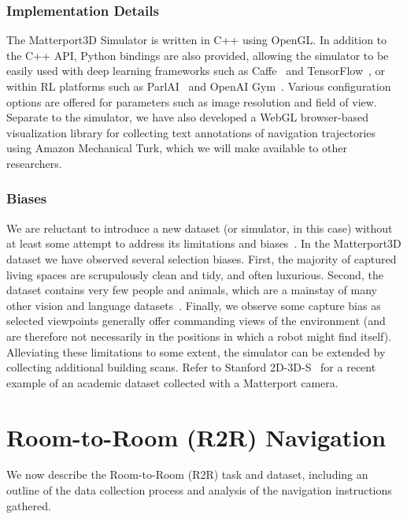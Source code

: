 \documentclass[10pt,twocolumn,letterpaper]{article}
\begin{document}
\subsubsection{Implementation Details}

The Matterport3D Simulator is written in C++ using OpenGL. In addition to the C++ API, Python bindings are also provided, allowing the simulator to be easily used with deep learning frameworks such as Caffe~\cite{jia2014caffe} and TensorFlow~\cite{abadi2016tensorflow}, or within RL platforms such as ParlAI~\cite{parlai} and OpenAI Gym~\cite{openaigym}. Various configuration options are offered for parameters such as image resolution and field of view. Separate to the simulator, we have also developed a WebGL browser-based visualization library for collecting text annotations of navigation trajectories using Amazon Mechanical Turk, which we will make available to other researchers.

\subsubsection{Biases}

We are reluctant to introduce a new dataset (or simulator, in this case) without at least some attempt to address its limitations and biases~\cite{torralba2011unbiased}. In the Matterport3D dataset we have observed several selection biases. First, the majority of captured living spaces are scrupulously clean and tidy, and often luxurious. Second, the dataset contains very few people and animals, which are a mainstay of many other vision and language datasets~\cite{Chen2015,VQA}. Finally, we observe some capture bias as selected viewpoints generally offer commanding views of the environment (and are therefore not necessarily in the positions in which a robot might find itself). Alleviating these limitations to some extent, the simulator can be extended by collecting additional building scans. Refer to Stanford 2D-3D-S~\cite{2017arXiv170201105A} for a recent example of an academic dataset collected with a Matterport camera. 


 \section{Room-to-Room (R2R) Navigation}
\label{sec:dataset}

We now describe the Room-to-Room (R2R) task and dataset, including an outline of the data collection process and analysis of the navigation instructions gathered. 
\end{document}
